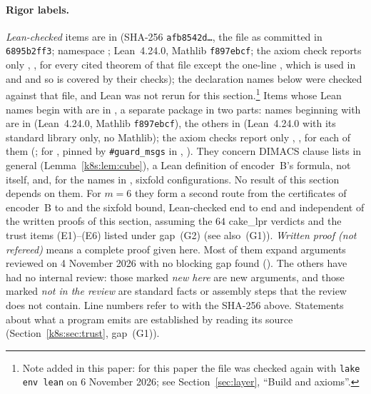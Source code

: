 \paragraph{Rigor labels.} \emph{Lean-checked} items are in  (SHA-256
\texttt{afb8542d\dots}, the file as committed in \texttt{6895b2ff3}; namespace ;
Lean~4.24.0, Mathlib \texttt{f897ebcf}; the axiom check  reports only ,
,  for every cited theorem of that file except the one-line
, which is used in  and  and so is covered by their
checks); the declaration names below were
checked against that file, and Lean was not rerun for this section.\footnote{Note added in this paper: for this paper the file was checked again with \texttt{lake env lean} on 6 November 2026; see Section~\ref{sec:layer}, ``Build and axioms''.} Items whose Lean names begin with  are in , a separate
package in two parts: names beginning with  are in  (Lean~4.24.0, Mathlib
\texttt{f897ebcf}), the others in  (Lean~4.24.0 with its standard library only, no Mathlib); the
axiom checks report only , ,  for each of them
(; for , pinned by \texttt{\#guard\_msgs} in
, ). They concern DIMACS
clause lists in general (Lemma~\ref{k8s:lem:cube}), a Lean definition of encoder~B's formula, not
 itself, and, for the names in , sixfold configurations. No result of this section depends on them. For $m=6$ they form a second route from the
certificates of encoder~B to  and the sixfold bound, Lean-checked end to end and independent of the
written proofs of this section, assuming the $64$ cake\_lpr verdicts and the trust items (E1)--(E6) listed under
gap~(G2) (see also~(G1)). \emph{Written proof (not refereed)} means a
complete proof given here. Most of them expand arguments reviewed on 4 November 2026 with no blocking gap found
(). The others have had no internal review: those marked \emph{new here} are new
arguments, and those marked \emph{not in the review} are standard facts or assembly steps that the review does not
contain. Line numbers refer to  with the SHA-256 above. Statements about what a program emits are
established by reading its source (Section~\ref{k8s:sec:trust}, gap~(G1)).


